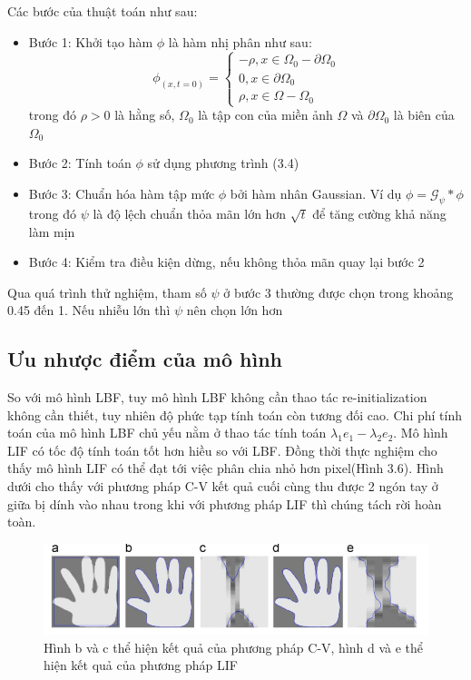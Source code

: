 \documentclass[12pt,oneside,a4]{report}
\newcommand{\G}{\mathcal G}
\begin{document}
Các bước của thuật toán như sau:
\begin{itemize}
\item Bước 1: Khởi tạo hàm $\phi$ là hàm nhị phân như sau:
\begin{equation}
\phi_(x,t=0)=\begin{cases}
-\rho, x\in \Omega_0 -\partial \Omega_0\\
0, x\in \partial \Omega_0\\
\rho, x\in \Omega- \Omega_0
\end{cases}
\end{equation}
 trong đó $\rho>0$ là hằng số, $\Omega_0$ là tập con  của miền ảnh $\Omega$ và $\partial \Omega_0$ là biên của $\Omega_0$
 \item Bước 2: Tính toán $\phi$ sử dụng phương trình (3.4)
 \item Bước 3: Chuẩn hóa hàm tập mức $\phi$ bởi hàm nhân Gaussian. Ví dụ $\phi=\G_{\psi}*\phi$ trong đó $\psi$ là độ lệch chuẩn thỏa mãn lớn hơn $\sqrt{t}$ để tăng cường khả năng làm mịn
 \item Bước 4: Kiểm tra điều kiện dừng, nếu không thỏa mãn quay lại bước 2
\end{itemize}
Qua quá trình thử nghiệm, tham số $\psi$ ở bước 3 thường được chọn trong khoảng 0.45 đến 1. Nếu nhiễu lớn thì $\psi$ nên chọn lớn hơn
\subsection{Ưu nhược điểm của mô hình}
So với mô hình LBF, tuy mô hình LBF không cần thao tác re-initialization không cần thiết, tuy nhiên độ phức tạp tính toán còn tương đối cao. Chi phí tính toán của mô hình LBF chủ yếu nằm ở thao tác tính toán $\lambda_1 e_1-\lambda_2 e_2$. Mô hình LIF có tốc độ tính toán tốt hơn hiều so với LBF. Đồng thời thực nghiệm cho thấy mô hình LIF có thể đạt tới việc phân chia nhỏ hơn pixel(Hình 3.6). Hình dưới cho thấy với phương pháp C-V kết quả cuối cùng thu được 2 ngón tay ở giữa bị dính vào nhau trong khi với phương pháp LIF thì chúng tách rời hoàn toàn.
\begin{center}
\begin{figure}
\caption{Hình b và c thể hiện kết quả của phương pháp C-V, hình  d và e thể hiện kết quả của phương pháp LIF}
\includegraphics[scale=0.7]{figure/subpixel.png}
\end{figure}

\end{center}   
\end{document}
